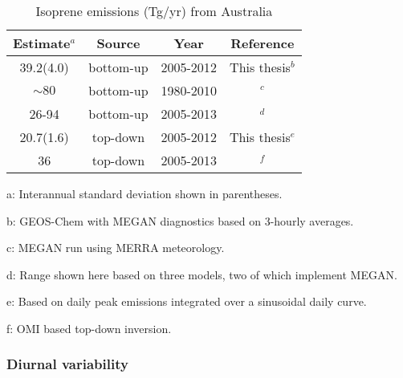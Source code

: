 \documentclass[acp, manuscript]{copernicus}
\newcommand{\textcite}{\citet}
\begin{document}
      
      \begin{table}\begin{threeparttable}
        \caption{Isoprene emissions (Tg/yr) from Australia}
        \begin{tabular}{ c c c c } 
          \toprule
          Estimate$^{a}$ & Source & Year & Reference \\
          \midrule
          39.2(4.0) & bottom-up & 2005-2012 & This thesis$^{b}$ \\ %
          $\sim 80$ & bottom-up & 1980-2010 & \textcite{Sindelarova2014}$^{c}$ \\ %
          26-94 & bottom-up & 2005-2013 & \textcite{Bauwens2016}$^{d}$ \\
          20.7(1.6) & top-down & 2005-2012 & This thesis$^{e}$ \\
          36 & top-down & 2005-2013 & \textcite{Bauwens2016}$^{f}$ \\
          \bottomrule
        \end{tabular}
        \begin{tablenotes} 
          \small
          \item a: Interannual standard deviation shown in parentheses.
          \item b: GEOS-Chem with MEGAN diagnostics based on 3-hourly averages. 
          \item c: MEGAN run using MERRA meteorology.  
          \item d: Range shown here based on three models, two of which implement MEGAN.
          \item e: Based on daily peak emissions integrated over a sinusoidal daily curve. 
          \item f: OMI based top-down inversion.
        \end{tablenotes}
        \label{BioIsop:results:emissions:tab_emissions_Tg}
      \end{threeparttable}\end{table}
    
    \subsubsection{Diurnal variability}
    
\end{document}
